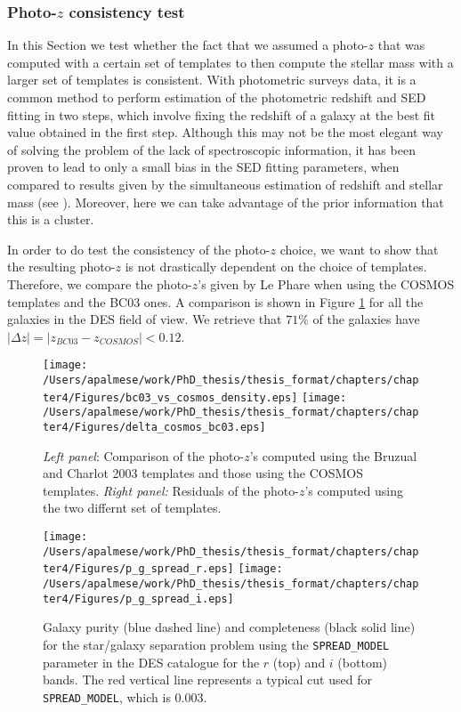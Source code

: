 {\subsubsection{Photo-$z$ consistency test}\label{test}
In this Section we test whether the fact that we assumed a photo-$z$ that was computed with a certain set of templates to then compute the stellar mass with a larger set of templates is consistent. With photometric surveys data, it is a common method to perform estimation of the photometric redshift and SED fitting in two steps, which involve fixing the redshift of a galaxy at the best fit value obtained in the first step. Although this may not be the most elegant way of solving the problem of the lack of spectroscopic information, it has been proven to lead to only a small bias in the SED fitting parameters, when compared to results given by the simultaneous estimation of redshift and stellar mass (see \citealt{acquaviva}). Moreover, here we can take advantage of the prior information that this is a cluster.

In order to do test the consistency of the photo-$z$ choice, we want to show that the resulting photo-$z$ is not drastically dependent on the choice of templates. Therefore, we compare the photo-$z$'s given by Le Phare when using the COSMOS templates and the BC03 ones. A comparison is shown in Figure \ref{bc03vscosmos} for all the galaxies in the DES field of view. We retrieve that $71\%$ of the galaxies have $|\Delta z|=|z_{BC03}-z_{COSMOS}|<0.12$.
\begin{figure}
\texttt{[image: /Users/apalmese/work/PhD\_thesis/thesis\_format/chapters/chapter4/Figures/bc03\_vs\_cosmos\_density.eps]}
\texttt{[image: /Users/apalmese/work/PhD\_thesis/thesis\_format/chapters/chapter4/Figures/delta\_cosmos\_bc03.eps]}\caption{\emph{Left panel}: Comparison  of the photo-$z$'s computed using the Bruzual and Charlot 2003 templates and those using the COSMOS templates. \emph{Right panel:} Residuals of the photo-$z$'s computed using the two differnt set of templates.}\label{bc03vscosmos}
\end{figure}


\begin{figure}
\centering
\texttt{[image: /Users/apalmese/work/PhD\_thesis/thesis\_format/chapters/chapter4/Figures/p\_g\_spread\_r.eps]}
\texttt{[image: /Users/apalmese/work/PhD\_thesis/thesis\_format/chapters/chapter4/Figures/p\_g\_spread\_i.eps]}
\caption{Galaxy purity (blue dashed line) and completeness (black solid line) for the star/galaxy separation problem using the \texttt{SPREAD\_MODEL} parameter in the DES catalogue for the $r$ (top) and $i$ (bottom) bands. The red vertical line represents a typical cut used for \texttt{SPREAD\_MODEL}, which is  0.003.}\label{purity}
\end{figure}



}
